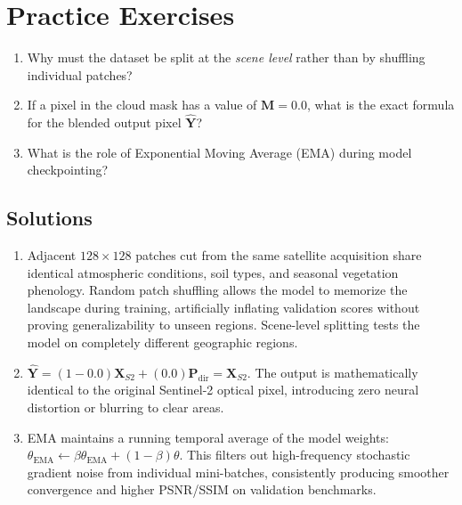 \section{Practice Exercises}
\begin{enumerate}
    \item Why must the dataset be split at the \emph{scene level} rather than by shuffling individual patches?
    \item If a pixel in the cloud mask has a value of $\mathbf{M} = 0.0$, what is the exact formula for the blended output pixel $\hat{\mathbf{Y}}$?
    \item What is the role of Exponential Moving Average (EMA) during model checkpointing?
\end{enumerate}

\subsection*{Solutions}
\begin{enumerate}
    \item Adjacent $128 \times 128$ patches cut from the same satellite acquisition share identical atmospheric conditions, soil types, and seasonal vegetation phenology. Random patch shuffling allows the model to memorize the landscape during training, artificially inflating validation scores without proving generalizability to unseen regions. Scene-level splitting tests the model on completely different geographic regions.
    \item $\hat{\mathbf{Y}} = (1 - 0.0)\mathbf{X}_{S2} + (0.0)\mathbf{P}_{\text{dir}} = \mathbf{X}_{S2}$. The output is mathematically identical to the original Sentinel-2 optical pixel, introducing zero neural distortion or blurring to clear areas.
    \item EMA maintains a running temporal average of the model weights: $\theta_{\text{EMA}} \leftarrow \beta \theta_{\text{EMA}} + (1 - \beta)\theta$. This filters out high-frequency stochastic gradient noise from individual mini-batches, consistently producing smoother convergence and higher PSNR/SSIM on validation benchmarks.
\end{enumerate}
